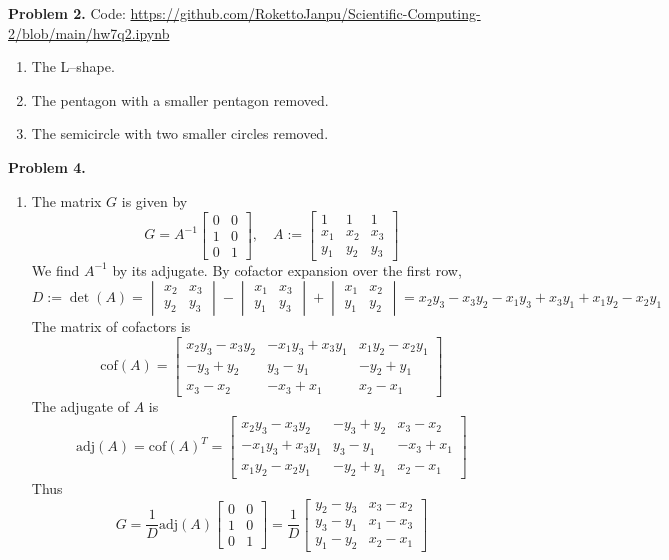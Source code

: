 \documentclass{article}
\def\tbf#1{\textbf{#1}}
\newcommand{\m}[2][b]{\begin{#1matrix}#2\end{#1matrix}}
\newcommand{\inv}{^{-1}}
\begin{document}
\tbf{Problem 2.} Code: \url{https://github.com/RokettoJanpu/Scientific-Computing-2/blob/main/hw7q2.ipynb}

\begin{enumerate}[label=(\alph*)]
	
\item The L--shape.

\item The pentagon with a smaller pentagon removed.

\item The semicircle with two smaller circles removed.
	
\end{enumerate}


\tbf{Problem 4.}

\begin{enumerate}[label=(\alph*)]
	
\item The matrix $G$ is given by
$$G = A\inv \m{0 & 0 \\ 1 & 0 \\ 0 & 1},
\quad A := \m{1 & 1 & 1 \\ x_1 & x_2 & x_3 \\ y_1 & y_2 & y_3}$$
We find $A\inv$ by its adjugate. By cofactor expansion over the first row,
$$D := \det(A)
= \m[v]{x_2 & x_3 \\ y_2 & y_3} - \m[v]{x_1 & x_3 \\ y_1 & y_3} + \m[v]{x_1 & x_2 \\ y_1 & y_2}
= x_2y_3 - x_3y_2 - x_1y_3 + x_3y_1 + x_1y_2 - x_2y_1$$
The matrix of cofactors is
$$\mathrm{cof}(A) = \m{x_2y_3-x_3y_2 & -x_1y_3+x_3y_1 & x_1y_2-x_2y_1 \\ -y_3+y_2 & y_3-y_1 & -y_2+y_1 \\ x_3-x_2 & -x_3+x_1 & x_2-x_1}$$
The adjugate of $A$ is
$$\mathrm{adj}(A) = \mathrm{cof}(A)^T
= \m{x_2y_3-x_3y_2 & -y_3+y_2  & x_3-x_2 \\ -x_1y_3+x_3y_1& y_3-y_1 & -x_3+x_1 \\ x_1y_2-x_2y_1 & -y_2+y_1 & x_2-x_1}$$
Thus
$$G = \frac{1}{D}\mathrm{adj}(A)\m{0 & 0 \\ 1 & 0 \\ 0 & 1}
= \frac{1}{D}\m{y_2-y_3 & x_3-x_2 \\ y_3-y_1 & x_1-x_3 \\ y_1-y_2 & x_2-x_1}$$


\end{enumerate}
\end{document}
